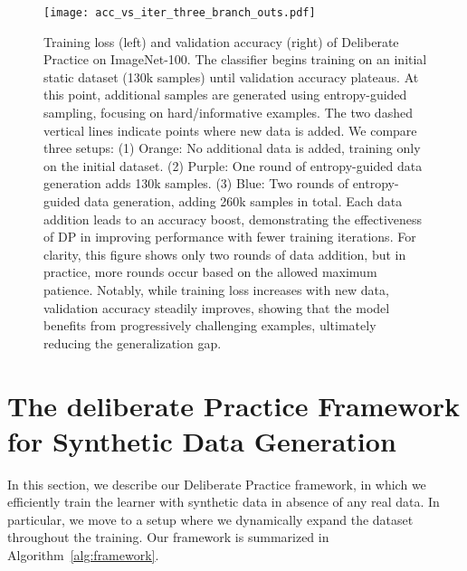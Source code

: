 
\begin{figure}[ht]
    \centering
\texttt{[image: acc\_vs\_iter\_three\_branch\_outs.pdf]}
\caption{
    Training loss (left) and validation accuracy (right) of Deliberate Practice on ImageNet-100.
    The classifier begins training on an initial static dataset (130k samples) until validation accuracy plateaus. At this point, additional samples are generated using entropy-guided sampling, focusing on hard/informative examples. The two dashed vertical lines indicate points where new data is added.
    We compare three setups: 
    (1) \textcolor[rgb]{0.8, 0.47, 0.39}{Orange}: No additional data is added, training only on the initial dataset. 
    (2) \textcolor[rgb]{0.6, 0.23, 0.64}{Purple}: One round of entropy-guided data generation adds 130k samples. 
    (3) \textcolor[rgb]{0.08, 0.04, 0.62}{Blue}: Two rounds of entropy-guided data generation, adding 260k samples in total. 
    Each data addition leads to an accuracy boost, demonstrating the effectiveness of DP in improving performance with fewer training iterations.
    For clarity, this figure shows only two rounds of data addition, but in practice, more rounds occur based on the allowed maximum patience. 
    Notably, while training loss increases with new data, validation accuracy steadily improves, showing that the model benefits from progressively challenging examples, ultimately reducing the generalization gap.
}
    \label{fig:branch_outs}
\end{figure}
\section{The deliberate Practice Framework for Synthetic Data Generation}\label{sec:dp}

In this section, we describe our Deliberate Practice framework, in which we efficiently train the learner with synthetic data in absence of any real data. In particular, we move to a  setup where we dynamically expand the dataset throughout the training.
Our framework is summarized in Algorithm~\ref{alg:framework}.


